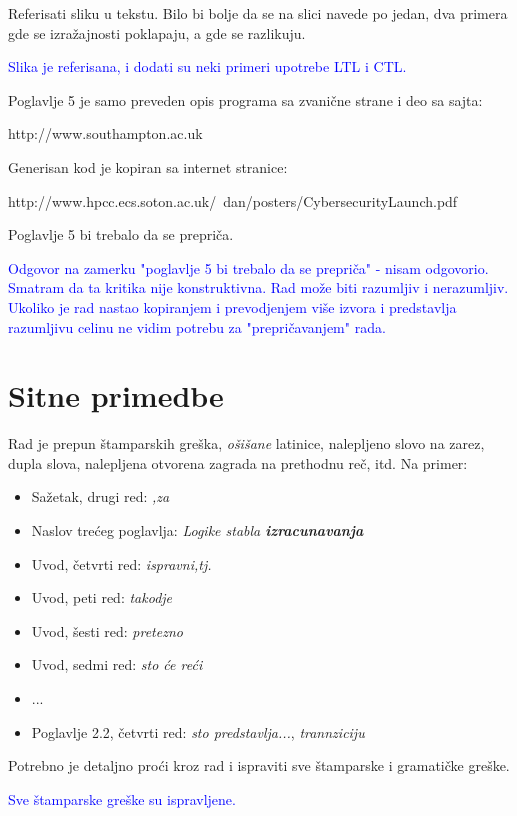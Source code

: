 \documentclass[a4paper]{report}
\newcommand{\odgovor}[1]{\textcolor{blue}{#1}}
\begin{document}
Referisati sliku u tekstu. Bilo bi bolje da se na slici navede po jedan, dva primera gde se izražajnosti poklapaju, a gde se razlikuju.

\odgovor{Slika je referisana, i dodati su neki primeri upotrebe LTL i CTL.}

Poglavlje 5 je samo preveden opis programa sa zvanične strane i deo sa sajta:

http://www.southampton.ac.uk

Generisan kod je kopiran sa internet stranice:

http://www.hpcc.ecs.soton.ac.uk/~dan/posters/CybersecurityLaunch.pdf

Poglavlje 5 bi trebalo da se prepriča. 

\odgovor{Odgovor na zamerku "poglavlje 5 bi trebalo da se prepriča" - nisam odgovorio. Smatram da ta kritika nije konstruktivna. Rad može biti razumljiv i nerazumljiv. Ukoliko je rad nastao kopiranjem i prevodjenjem više izvora i predstavlja razumljivu celinu ne vidim potrebu za "prepričavanjem" rada.}

\section{Sitne primedbe}

Rad je prepun štamparskih greška, \textit{ošišane} latinice, nalepljeno slovo na zarez, dupla slova, nalepljena otvorena zagrada na prethodnu reč, itd. Na primer:
\begin{itemize}
	\item Sažetak, drugi red: \textit{,za}
	\item Naslov trećeg poglavlja: \textit{Logike stabla \textbf{izracunavanja}}
	\item  Uvod, četvrti red: \textit{ispravni,tj.}
	\item Uvod, peti red: \textit{takodje}
	\item Uvod, šesti red: \textit{pretezno}
	\item Uvod, sedmi red: \textit{sto će reći}
	\item ...
	\item Poglavlje 2.2, četvrti red: \textit{sto predstavlja...}, \textit{trannziciju} 
\end{itemize}

Potrebno je detaljno proći kroz rad i ispraviti sve štamparske i gramatičke greške. 

\odgovor{Sve štamparske greške su ispravljene.}
\end{document}
